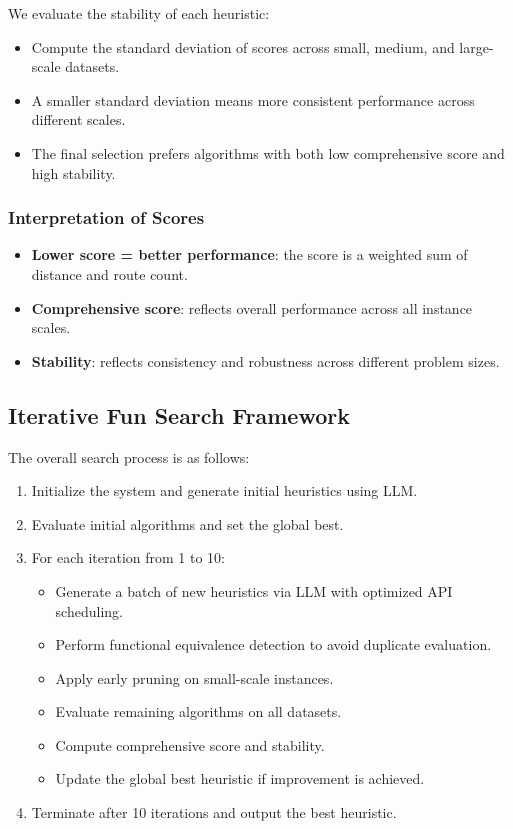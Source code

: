 \documentclass{article}
\begin{document}
We evaluate the stability of each heuristic:
\begin{itemize}
    \item Compute the standard deviation of scores across small, medium, and large-scale datasets.
    \item A smaller standard deviation means more consistent performance across different scales.
    \item The final selection prefers algorithms with both low comprehensive score and high stability.
\end{itemize}

\subsubsection{Interpretation of Scores}

\begin{itemize}
    \item \textbf{Lower score = better performance}: the score is a weighted sum of distance and route count.
    \item \textbf{Comprehensive score}: reflects overall performance across all instance scales.
    \item \textbf{Stability}: reflects consistency and robustness across different problem sizes.
\end{itemize}

\subsection{Iterative Fun Search Framework}

The overall search process is as follows:
\begin{enumerate}
    \item Initialize the system and generate initial heuristics using LLM.
    \item Evaluate initial algorithms and set the global best.
    \item For each iteration from 1 to 10:
    \begin{itemize}
        \item Generate a batch of new heuristics via LLM with optimized API scheduling.
        \item Perform functional equivalence detection to avoid duplicate evaluation.
        \item Apply early pruning on small-scale instances.
        \item Evaluate remaining algorithms on all datasets.
        \item Compute comprehensive score and stability.
        \item Update the global best heuristic if improvement is achieved.
    \end{itemize}
    \item Terminate after 10 iterations and output the best heuristic.
\end{enumerate}
\end{document}
